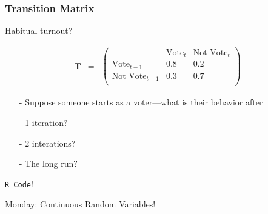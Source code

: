 \documentclass{beamer}
\numberwithin{equation}{section}
\begin{document}
\begin{frame}
\frametitle{Transition Matrix}

Habitual turnout?


\begin{eqnarray}
\boldsymbol{T} & = & 
\begin{pmatrix}
				  & \text{Vote}_{t} & \text{Not Vote}_{t}\\
\text{Vote}_{t-1} & 0.8 & 0.2 \\ 
\text{Not Vote}_{t-1} &  0.3 & 0.7\\
\end{pmatrix} \nonumber 
\end{eqnarray}

\begin{itemize}
\item[-] Suppose someone starts as a voter---what is their behavior after
\item[-] 1 iteration?
\item[-] 2 interations?
\item[-] The long run?
\end{itemize}

{\tt R Code}!


\end{frame}





\begin{frame}

Monday: Continuous Random Variables!


\end{frame}
\end{document}
